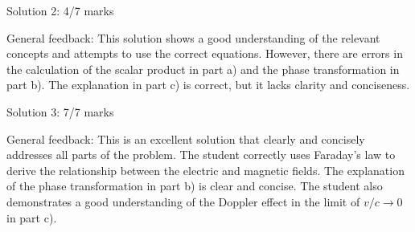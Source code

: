 \documentclass[a4paper,11pt]{article}
\begin{document}
Solution 2: 4/7 marks

General feedback: This solution shows a good understanding of the relevant concepts and attempts to use the correct equations. However, there are errors in the calculation of the scalar product in part a) and the phase transformation in part b). The explanation in part c) is correct, but it lacks clarity and conciseness.

Solution 3: 7/7 marks

General feedback: This is an excellent solution that clearly and concisely addresses all parts of the problem. The student correctly uses Faraday's law to derive the relationship between the electric and magnetic fields. The explanation of the phase transformation in part b) is clear and concise. The student also demonstrates a good understanding of the Doppler effect in the limit of \( v/c \rightarrow 0 \) in part c).
\end{document}
